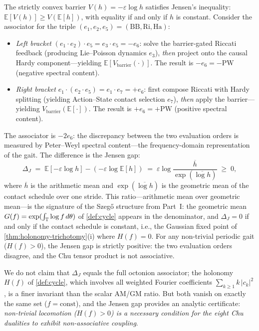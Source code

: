 \begin{remark}
\label{rmk:jensen-gap}
The strictly convex barrier
$V(h) = -\varepsilon \log h$ satisfies Jensen's inequality:
$\mathbb{E}[V(h)] \geq V(\mathbb{E}[h])$, with equality if and
only if $h$ is constant.
Consider the associator for the triple
$(e_1, e_2, e_5) = (\text{BB}, \text{Ri}, \text{Ha})$:
\begin{itemize}[nosep]
\item \emph{Left bracket}
  $(e_1 \cdot e_2) \cdot e_5 = e_3 \cdot e_5 = -e_6$:
  solve the barrier-gated Riccati feedback (producing
  Lie--Poisson dynamics $e_3$), \emph{then} project onto the
  causal Hardy component---yielding
  $\mathbb{E}[V_{\mathrm{barrier}}(\cdot)]$.
  The result is $-e_6 = -\text{PW}$ (negative spectral content).
\item \emph{Right bracket}
  $e_1 \cdot (e_2 \cdot e_5) = e_1 \cdot e_7 = +e_6$:
  first compose Riccati with Hardy splitting (yielding
  Action--State contact selection $e_7$), \emph{then} apply the
  barrier---yielding
  $V_{\mathrm{barrier}}(\mathbb{E}[\cdot])$.
  The result is $+e_6 = +\text{PW}$ (positive spectral content).
\end{itemize}
The associator is $-2e_6$: the discrepancy between the two
evaluation orders is measured by Peter--Weyl spectral content---the
frequency-domain representation of the gait.
The difference is the Jensen gap:
\begin{equation}\label{eq:jensen-gap}
  \Delta_J
  \;=\; \mathbb{E}[-\varepsilon \log h]
  - (-\varepsilon \log \mathbb{E}[h])
  \;=\; \varepsilon \log
  \frac{\overline{h}}{\exp(\overline{\log h})}
  \;\geq\; 0,
\end{equation}
where $\overline{h}$ is the arithmetic mean and
$\exp(\overline{\log h})$ is the geometric mean of the contact
schedule over one stride.
This ratio---arithmetic mean over geometric mean---is the
signature of the Szeg\H{o} structure from Part~I:
the geometric mean $G(f) = \exp(\int_{\mathbb{T}} \log f\, d\theta)$
of \cref{def:cycle} appears in the denominator, and
$\Delta_J = 0$ if and only if the contact schedule is
constant, i.e., the Gaussian fixed point of
\cref{thm:holonomy-trichotomy}(i) where $H(f) = 0$.
For any non-trivial periodic gait ($H(f) > 0$), the Jensen gap
is strictly positive: the two evaluation orders disagree, and
the Chu tensor product is not associative.

We do not claim that $\Delta_J$ equals the full octonion
associator; the holonomy $H(f)$ of \cref{def:cycle},
which involves all weighted Fourier coefficients
$\sum_{k \geq 1} k\,|c_k|^2$, is a finer invariant than the
scalar AM/GM ratio.
But both vanish on exactly the same set ($f = \mathrm{const}$),
and the Jensen gap provides an analytic certificate:
\emph{non-trivial locomotion ($H(f) > 0$) is a necessary
condition for the eight Chu dualities to exhibit
non-associative coupling}.
\end{remark}

